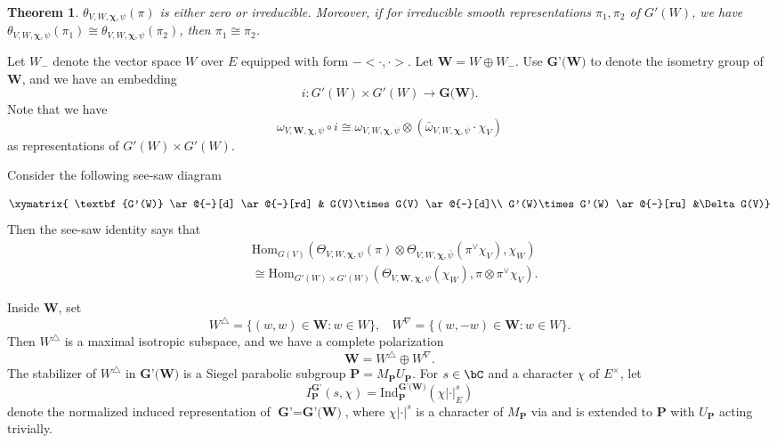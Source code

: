 \documentclass[twoside]{amsart}
\newcommand{\Hom}{{\mathrm{Hom}}} \renewcommand{\Im}{{\mathrm{Im}}}
\newcommand{\Ind}{{\mathrm{Ind}}} \newcommand{\ind}{{\mathrm{ind}}}
\theoremstyle{plain}
\newtheorem{thm}{Theorem}[section] \newtheorem{corollary}[thm]{Corollary}
\numberwithin{equation}{section}
\begin{document}
\begin{thm}
$\theta_{V,W,\boldsymbol{\chi},\psi}(\pi)$ is either zero or irreducible. Moreover, if for irreducible smooth representations $\pi_1, \pi_2$ of $G'(W)$, we have $\theta_{V,W,\boldsymbol{\chi},\psi}(\pi_1)\cong \theta_{V,W,\boldsymbol{\chi},\psi}(\pi_2)$, then $\pi_1\cong \pi_2$.
\end{thm}

Let $W_{-}$ denote the vector space $W$ over $E$ equipped with form $-<\cdot,\cdot>$. Let $\textbf{W}=W\oplus W_{-}$. Use $\textbf{G'(W)}$ to denote the isometry group of $\textbf{W}$, and we have an embedding
\[
i: G'(W)\times G'(W) \to \textbf{G(W)}.
\]  
Note that we have 
\[
\omega_{V,\textbf{W},\boldsymbol{\chi},\psi}\circ i\cong \omega_{V,W,\boldsymbol{\chi},\psi}\otimes (\bar{\omega}_{V,W,\boldsymbol{\chi},\psi}\cdot \chi_V)
\]
as representations of $G'(W)\times G'(W)$.

Consider the following see-saw diagram

\begin{displaymath}
\xymatrix{
\textbf{G'(W)} \ar@{-}[d] \ar@{-}[rd] & G(V)\times G(V) \ar@{-}[d]\\
G'(W)\times G'(W) \ar@{-}[ru]
&\Delta G(V)}
\end{displaymath}
Then the see-saw identity says that
\begin{eqnarray}
\label{see-saw}
&\Hom_{G(V)} (\Theta_{V,W,\boldsymbol{\chi},\psi}(\pi)\otimes \Theta_{V,W,\boldsymbol{\chi},\bar{\psi}}(\pi^\vee \chi_V), \chi_W ) \nonumber  \\
&\cong \Hom_{G'(W)\times G'(W)}(\Theta_{V,\textbf{W},\boldsymbol{\chi},\psi}(\chi_W), \pi\otimes \pi^\vee \chi_V ).
\end{eqnarray}

Inside $\textbf{W}$, set
\[
W^\triangle =\{ (w,w)\in \textbf{W}:w\in W \}, \ \ \ \ W^\nabla=\{(w,-w)\in \textbf{W}: w\in W \}.
\]
Then $W^\triangle$ is a maximal isotropic subspace, and we have a complete polarization
\[
\textbf{W}=W^\triangle \oplus W^\nabla.
\]
The stabilizer of $W^\triangle$ in $\textbf{G'(W)}$ is a Siegel parabolic subgroup $\textbf{P}=M_{\textbf{P}}U_\textbf{P}$. For $s\in \bC$ and a character $\chi$ of $E^\times$, let
\[
I_{\textbf{P}}^{\textbf{G'}}(s,\chi)=\Ind_{\textbf{P}}^{\textbf{G'(W)}} (\chi |\cdot|_E^s)
\]
denote the normalized induced representation of $\textbf{G'}=\textbf{G'(W)}$, where $\chi |\cdot|^s$ is a character of $M_{\textbf{P}}$ via 
and is extended to $\textbf{P}$ with $U_{\textbf{P}}$ acting trivially.
\end{document}
